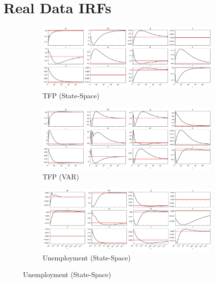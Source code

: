 \documentclass{article}
\begin{document}
\FloatBarrier

\section{Real Data IRFs} \label{real_irfs}

\begin{figure}[!ht]
  \centering
  \begin{subfigure}{0.8\textwidth}
    \centering
    \includegraphics[width=\linewidth]{images/real_data_z_irf.png} 
    \caption{TFP (State-Space)}
    \label{us_z_irf}
  \end{subfigure}
  \begin{subfigure}{0.8\textwidth}
    \centering
    \includegraphics[width=\linewidth]{images/real_data_z_var_irf.png} 
    \caption{TFP (VAR)}
    \label{us_z_var_irf}
  \end{subfigure}
  \begin{subfigure}{0.8\textwidth}
    \includegraphics[width=\linewidth]{images/real_data_u_irf.png}
    \caption{Unemployment (State-Space)}
    \label{us_u_irf}

\end{subfigure}
\end{figure}
\end{document}
